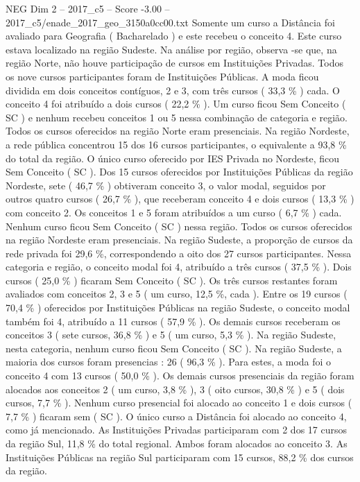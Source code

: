 \begin{textsample}{NEG Dim 2 – 2017\_c5 – Score -3.00 – 2017\_c5/enade\_2017\_geo\_3150a0cc00.txt}
Somente um curso a Distância foi avaliado para Geografia ( Bacharelado ) e este recebeu o conceito 4.
Este curso estava localizado na região Sudeste.
Na análise por região, observa -se que, na região Norte, não houve participação de cursos em Instituições Privadas.
Todos os nove cursos participantes foram de Instituições Públicas.
A moda ficou dividida em dois conceitos contíguos, 2 e 3, com três cursos ( 33,3 \% ) cada.
O conceito 4 foi atribuído a dois cursos ( 22,2 \% ).
Um curso ficou Sem Conceito ( SC ) e nenhum recebeu conceitos 1 ou 5 nessa combinação de categoria e região.
Todos os cursos oferecidos na região Norte eram presenciais.
Na região Nordeste, a rede pública concentrou 15 dos 16 cursos participantes, o equivalente a 93,8 \% do total da região.
O único curso oferecido por IES Privada no Nordeste, ficou Sem Conceito ( SC ).
Dos 15 cursos oferecidos por Instituições Públicas da região Nordeste, sete ( 46,7 \% ) obtiveram conceito 3, o valor modal, seguidos por outros quatro cursos ( 26,7 \% ), que receberam conceito 4 e dois cursos ( 13,3 \% ) com conceito 2.
Os conceitos 1 e 5 foram atribuídos a um curso ( 6,7 \% ) cada.
Nenhum curso ficou Sem Conceito ( SC ) nessa região.
Todos os cursos oferecidos na região Nordeste eram presenciais.
Na região Sudeste, a proporção de cursos da rede privada foi 29,6 \%, correspondendo a oito dos 27 cursos participantes.
Nessa categoria e região, o conceito modal foi 4, atribuído a três cursos ( 37,5 \% ).
Dois cursos ( 25,0 \% ) ficaram Sem Conceito ( SC ).
Os três cursos restantes foram avaliados com conceitos 2, 3 e 5 ( um curso, 12,5 \%, cada ).
Entre os 19 cursos ( 70,4 \% ) oferecidos por Instituições Públicas na região Sudeste, o conceito modal também foi 4, atribuído a 11 cursos ( 57,9 \% ).
Os demais cursos receberam os conceitos 3 ( sete cursos, 36,8 \% ) e 5 ( um curso, 5,3 \% ).
Na região Sudeste, nesta categoria, nenhum curso ficou Sem Conceito ( SC ).
Na região Sudeste, a maioria dos cursos foram presencias : 26 ( 96,3 \% ).
Para estes, a moda foi o conceito 4 com 13 cursos ( 50,0 \% ).
Os demais cursos presenciais da região foram alocados aos conceitos 2 ( um curso, 3,8 \% ), 3 ( oito cursos, 30,8 \% ) e 5 ( dois cursos, 7,7 \% ).
Nenhum curso presencial foi alocado ao conceito 1 e dois cursos ( 7,7 \% ) ficaram sem ( SC ).
O único curso a Distância foi alocado ao conceito 4, como já mencionado.
As Instituições Privadas participaram com 2 dos 17 cursos da região Sul, 11,8 \% do total regional.
Ambos foram alocados ao conceito 3.
As Instituições Públicas na região Sul participaram com 15 cursos, 88,2 \% dos cursos da região.

\end{textsample}

